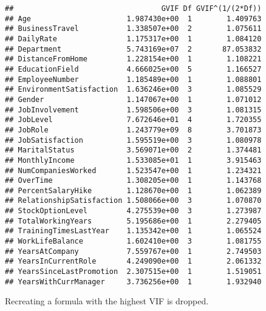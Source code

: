 \documentclass[
]{article}
\begin{document}
\begin{verbatim}
##                                  GVIF Df GVIF^(1/(2*Df))
## Age                      1.987430e+00  1        1.409763
## BusinessTravel           1.338507e+00  2        1.075611
## DailyRate                1.175317e+00  1        1.084120
## Department               5.743169e+07  2       87.053832
## DistanceFromHome         1.228154e+00  1        1.108221
## EducationField           4.666025e+00  5        1.166527
## EmployeeNumber           1.185489e+00  1        1.088801
## EnvironmentSatisfaction  1.636246e+00  3        1.085529
## Gender                   1.147067e+00  1        1.071012
## JobInvolvement           1.598506e+00  3        1.081315
## JobLevel                 7.672646e+01  4        1.720355
## JobRole                  1.243779e+09  8        3.701873
## JobSatisfaction          1.595519e+00  3        1.080978
## MaritalStatus            3.569071e+00  2        1.374481
## MonthlyIncome            1.533085e+01  1        3.915463
## NumCompaniesWorked       1.523547e+00  1        1.234321
## OverTime                 1.308205e+00  1        1.143768
## PercentSalaryHike        1.128670e+00  1        1.062389
## RelationshipSatisfaction 1.508066e+00  3        1.070870
## StockOptionLevel         4.275539e+00  3        1.273987
## TotalWorkingYears        5.195686e+00  1        2.279405
## TrainingTimesLastYear    1.135342e+00  1        1.065524
## WorkLifeBalance          1.602410e+00  3        1.081755
## YearsAtCompany           7.559767e+00  1        2.749503
## YearsInCurrentRole       4.249090e+00  1        2.061332
## YearsSinceLastPromotion  2.307515e+00  1        1.519051
## YearsWithCurrManager     3.736256e+00  1        1.932940
\end{verbatim}

Recreating a formula with the highest VIF is dropped.
\end{document}
